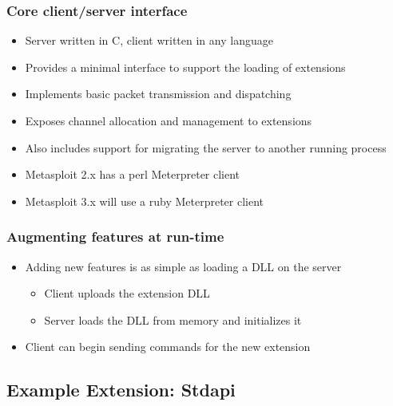 \documentclass{beamer}
\newenvironment{sitemize}{\vspace{1mm}\begin{itemize}\itemsep 4pt\small}{\end{itemize}}
\begin{document}
%
%

\begin{frame}[t]
    \frametitle{Core client/server interface}

    \begin{sitemize}
        \item Server written in C, client written in any language

        \pause
        \item Provides a minimal interface to support the loading of extensions

        \pause
        \item Implements basic packet transmission and dispatching
        \item Exposes channel allocation and management to
        extensions

        \pause
        \item Also includes support for migrating the server to
        another running process
    \end{sitemize}

    \pause
    \begin{sitemize}
        \item Metasploit 2.x has a perl Meterpreter client
        \item Metasploit 3.x will use a ruby Meterpreter client
    \end{sitemize}
\end{frame}

\begin{frame}[t]
    \frametitle{Augmenting features at run-time}

    \begin{sitemize}
        \item Adding new features is as simple as loading a DLL on
        the server
        \begin{sitemize}
            \item Client uploads the extension DLL
            \item Server loads the DLL from memory and
            initializes it
        \end{sitemize}

        \pause
        \item Client can begin sending commands for the new
        extension
    \end{sitemize}
\end{frame}

\subsection{Example Extension: Stdapi}
\end{document}
